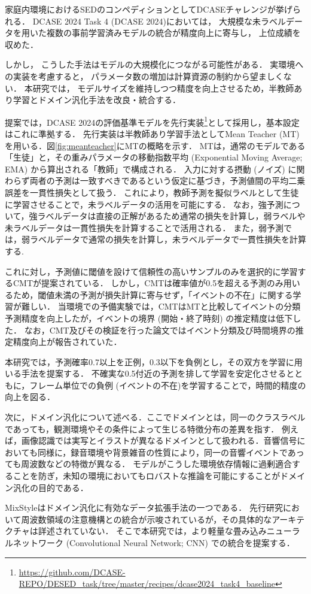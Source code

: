 \documentclass[main]{subfiles}
\begin{document}
家庭内環境におけるSEDのコンペディションとしてDCASEチャレンジが挙げられる． 
DCASE 2024 Task 4 (DCASE 2024)においては， 大規模な未ラベルデータを用いた複数の事前学習済みモデルの統合が精度向上に寄与し， 上位成績を収めた\cite{schmid2024improving}．\par
 しかし， こうした手法はモデルの大規模化につながる可能性がある． 
 実環境への実装を考慮すると， パラメータ数の増加は計算資源の制約から望ましくない． 
 本研究では， モデルサイズを維持しつつ精度を向上させるため，半教師あり学習とドメイン汎化手法を改良・統合する．\par

提案では，DCASE 2024の評価基準モデルを先行実装\footnote{\url{https://github.com/DCASE-REPO/DESED_task/tree/master/recipes/dcase2024_task4_baseline}}として採用し，基本設定はこれに準拠する\cite{cornell2024dcase}．
先行実装は半教師あり学習手法としてMean Teacher (MT) を用いる．図\ref{fig:meanteacher}にMTの概略を示す．
MTは，通常のモデルである「生徒」と，その重みパラメータの移動指数平均 (Exponential Moving Average; EMA) から算出される「教師」で構成される．
入力に対する摂動 (ノイズ) に関わらず両者の予測は一致すべきであるという仮定に基づき，予測値間の平均二乗誤差を一貫性損失として扱う．
これにより，教師予測を擬似ラベルとして生徒に学習させることで，未ラベルデータの活用を可能にする\cite{tarvainen2017mean}．
なお，強予測について，強ラベルデータは直接の正解があるため通常の損失を計算し，弱ラベルや未ラベルデータは一貫性損失を計算することで活用される．
また，弱予測では，弱ラベルデータで通常の損失を計算し，未ラベルデータで一貫性損失を計算する.\par

これに対し，予測値に閾値を設けて信頼性の高いサンプルのみを選択的に学習するCMTが提案されている\cite{xiao2023multi}．
しかし，CMTは確率値が0.5を超える予測のみ用いるため，閾値未満の予測が損失計算に寄与せず，「イベントの不在」に関する学習が難しい．
当環境での予備実験では，CMTはMTと比較してイベントの分類予測精度を向上したが，イベントの境界 (開始・終了時刻) の推定精度は低下した．
なお，CMT及びその検証を行った論文ではイベント分類及び時間境界の推定精度向上が報告されていた\cite{11036061}．\par

本研究では，予測確率0.7以上を正例，0.3以下を負例とし，その双方を学習に用いる手法を提案する．
不確実な0.5付近の予測を排して学習を安定化させるとともに，フレーム単位での負例 (イベントの不在)を学習することで，時間的精度の向上を図る．\par

次に，ドメイン汎化について述べる．ここでドメインとは，同一のクラスラベルであっても，観測環境やその条件によって生じる特徴分布の差異を指す．
例えば，画像認識では実写とイラストが異なるドメインとして扱われる．音響信号においても同様に，録音環境や背景雑音の性質により，同一の音響イベントであっても周波数などの特徴が異なる．
モデルがこうした環境依存情報に過剰適合することを防ぎ，未知の環境においてもロバストな推論を可能にすることがドメイン汎化の目的である．\par

MixStyle\cite{zhou2021domain}はドメイン汎化に有効なデータ拡張手法の一つである．
先行研究\cite{xiao2024fmsg}において周波数領域の注意機構との統合が示唆されているが，その具体的なアーキテクチャは詳述されていない．
そこで本研究では，より軽量な畳み込みニューラルネットワーク (Convolutional Neural Network; CNN) での統合を提案する． 
\end{document}

